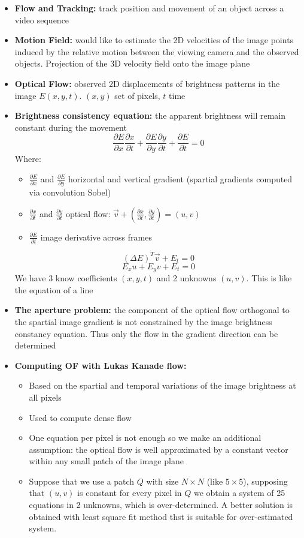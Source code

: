 \documentclass{article}
\begin{document}
\begin{itemize}
    \item \textbf{Flow and Tracking:} track position and movement of an object across a video sequence
    \item \textbf{Motion Field:} would like to estimate the 2D velocities of the image points induced by the relative motion between the viewing camera and the observed objects. Projection of the 3D velocity field onto the image plane
    \item \textbf{Optical Flow:} observed 2D displacements of brightness patterns in the image \(E(x,y,t)\). \((x, y)\) set of pixels, \(t\) time
    \item \textbf{Brightness consistency equation:} the apparent brightness will remain constant during the movement
    \[\frac{\partial E}{\partial x} \frac{\partial x}{\partial t} + \frac{\partial E}{\partial y} \frac{\partial y}{\partial t} + \frac{\partial E}{\partial t} = 0\]
    Where:
    \begin{itemize}
        \item \(\frac{\partial E}{\partial x}\) and \(\frac{\partial E}{\partial y}\) horizontal and vertical gradient (spartial gradients computed via convolution Sobel)
        \item \(\frac{\partial x}{\partial t}\) and \(\frac{\partial y}{\partial t}\) optical flow: \(\vec{v} + (\frac{\partial x}{\partial t}, \frac{\partial y}{\partial t}) = (u,v)\)
        \item \(\frac{\partial E}{\partial t}\) image derivative across frames
    \end{itemize}
    \[(\Delta E)^T \vec{v} + E_t = 0\]
    \[E_xu + E_yv + E_t = 0\]
    We have 3 know coefficients \((x,y,t)\) and 2 unknowns \((u,v)\). This is like the equation of a line

    \item \textbf{The aperture problem:} the component of the optical flow orthogonal to the spartial image gradient is not constrained by the image brightness constancy equation. Thus only the flow in the gradient direction can be determined

    \item \textbf{Computing OF with Lukas Kanade flow:}
    \begin{itemize}
        \item Based on the spartial and temporal variations of the image brightness at all pixels
        \item Used to compute dense flow
        \item One equation per pixel is not enough so we make an additional assumption: the optical flow is well approximated by a constant vector within any small patch of the image plane
        \item Suppose that we use a patch \(Q\) with size \(N \times N\) (like \(5 \times 5\)), supposing that \((u,v)\) is constant for every pixel in \(Q\) we obtain a system of 25 equations in 2 unknowns, which is over-determined. A better solution is obtained with least square fit method thst is suitable for over-estimated system.


\end{itemize}
\end{itemize}
\end{document}
